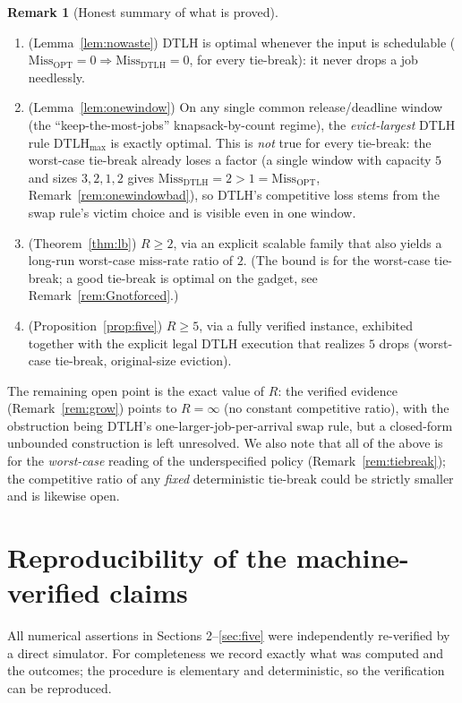 \documentclass{amsart}
\theoremstyle{definition}
\newtheorem{remark}[theorem]{Remark}
\begin{document}
\begin{remark}[Honest summary of what is proved]
\begin{enumerate}
\item (Lemma~\ref{lem:nowaste}) DTLH is optimal whenever the input is
schedulable ($\mathrm{Miss}_{\mathrm{OPT}}=0\Rightarrow
\mathrm{Miss}_{\mathrm{DTLH}}=0$, for every tie-break): it never drops a job
needlessly.
\item (Lemma~\ref{lem:onewindow}) On any single common release/deadline window
(the ``keep-the-most-jobs'' knapsack-by-count regime), the \emph{evict-largest}
DTLH rule $\mathrm{DTLH}_{\max}$ is exactly optimal. This is \emph{not} true for
every tie-break: the worst-case tie-break already loses a factor (a single window
with capacity $5$ and sizes $3,2,1,2$ gives
$\mathrm{Miss}_{\mathrm{DTLH}}=2>1=\mathrm{Miss}_{\mathrm{OPT}}$,
Remark~\ref{rem:onewindowbad}), so DTLH's competitive loss stems from the swap
rule's victim choice and is visible even in one window.
\item (Theorem~\ref{thm:lb}) $R\ge 2$, via an explicit scalable family that also
yields a long-run worst-case miss-rate ratio of $2$. (The bound is for the
worst-case tie-break; a good tie-break is optimal on the gadget, see
Remark~\ref{rem:Gnotforced}.)
\item (Proposition~\ref{prop:five}) $R\ge 5$, via a fully verified instance,
exhibited together with the explicit legal DTLH execution that realizes $5$
drops (worst-case tie-break, original-size eviction).
\end{enumerate}
The remaining open point is the exact value of $R$: the verified evidence
(Remark~\ref{rem:grow}) points to $R=\infty$ (no constant competitive ratio),
with the obstruction being DTLH's one-larger-job-per-arrival swap rule, but a
closed-form unbounded construction is left unresolved. We also note that all of
the above is for the \emph{worst-case} reading of the underspecified policy
(Remark~\ref{rem:tiebreak}); the competitive ratio of any \emph{fixed}
deterministic tie-break could be strictly smaller and is likewise open.
\end{remark}

\appendix
\section{Reproducibility of the machine-verified claims}\label{app:verify}

All numerical assertions in Sections 2--\ref{sec:five} were independently
re-verified by a direct simulator. For completeness we record exactly what was
computed and the outcomes; the procedure is elementary and deterministic, so the
verification can be reproduced.
\end{document}
